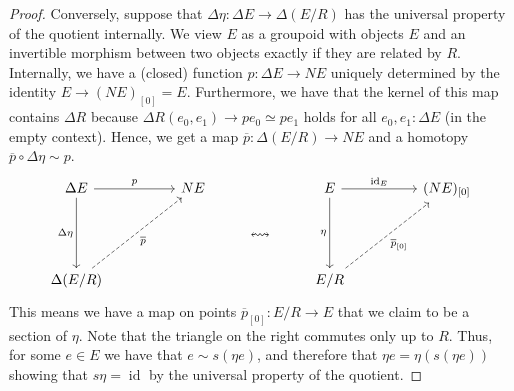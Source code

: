 \documentclass[10pt,a4paper]{article}
\newcommand\El{\mathsf{El}}
\newcommand\p{\mathsf{p}}
\newcommand\q{\mathsf{q}}
\DeclareMathOperator\id{id}
\begin{document}
\begin{proof}
  Conversely, suppose that $\Delta\eta \colon \Delta E \to \Delta(E/R)$ has the universal property of the quotient internally.
  We view $E$ as a groupoid with objects $E$ and an invertible morphism between two objects exactly if they are related by $R$.
  Internally, we have a (closed) function $p \colon \Delta E \to NE$ uniquely determined by the identity $E \to (NE)_{[0]} = E$.
  Furthermore, we have that the kernel of this map contains $\Delta R$ because $\Delta R(e_0, e_1) \to pe_0 \simeq pe_1$ holds for all $e_0, e_1 \colon \Delta E$ (in the empty context).
  Hence, we get a map $\overline{p} \colon \Delta(E/R) \to NE$ and a homotopy $\overline p \circ \Delta\eta \sim p$.
  \[\begin{tikzcd}
    \Delta E \arrow[dd, "\Delta\eta"'] \arrow[rr, "p"] &  & NE &                      & E \arrow[dd, "\eta"'] \arrow[rr, "\id_E"]        &  & {(NE)_{[0]}} \\
                                                      &  &    & \leftrightsquigarrow &                                                  &  &              \\
    \Delta (E/R) \arrow[rruu, "\overline p"', dashed]  &  &    &                      & E/R \arrow[rruu, "{\overline p_{[0]}}"', dashed] &  &             
  \end{tikzcd}\]
  This means we have a map on points $\overline{p}_{[0]} \colon E/R \to E$ that we claim to be a section of \(\eta\).
  Note that the triangle on the right commutes only up to $R$.
  Thus, for some $e \in E$ we have that $e \sim s (\eta e)$, and therefore that $\eta e = \eta (s (\eta e))$ showing that $s\eta = \id$ by the universal property of the quotient.
\end{proof}
\end{document}
